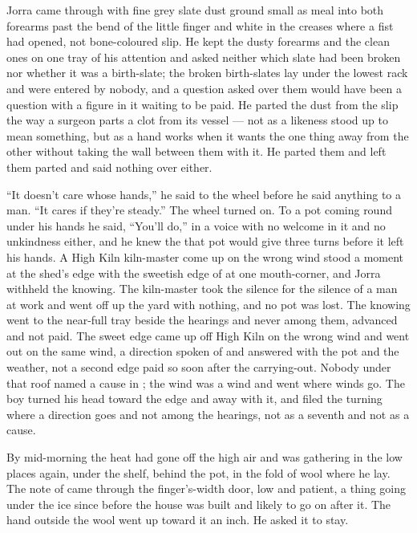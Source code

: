 Jorra came through with fine grey slate dust ground small as meal into both forearms past the bend of the little finger and white in the creases where a fist had opened, not bone-coloured slip. He kept the dusty forearms and the clean ones on one tray of his attention and asked neither which slate had been broken nor whether it was a birth-slate; the broken birth-slates lay under the lowest rack and were entered by nobody, and a question asked over them would have been a question with a figure in it waiting to be paid. He parted the dust from the slip the way a surgeon parts a clot from its vessel --- not as a likeness stood up to mean something, but as a hand works when it wants the one thing away from the other without taking the wall between them with it. He parted them and left them parted and said nothing over either.

“It doesn't care whose hands,” he said to the wheel before he said anything to a man. “It cares if they're steady.” The wheel turned on. To a pot coming round under his hands he said, “You'll do,” in a voice with no welcome in it and no unkindness either, and he knew the  that pot would give three turns before it left his hands. A High Kiln kiln-master come up on the wrong wind stood a moment at the shed's edge with the sweetish edge of  at one mouth-corner, and Jorra withheld the knowing. The kiln-master took the silence for the silence of a man at work and went off up the yard with nothing, and no pot was lost. The knowing went to the near-full tray beside the hearings and never among them, advanced and not paid. The sweet edge came up off High Kiln on the wrong wind and went out on the same wind, a direction spoken of and answered with the pot and the weather, not a second edge paid so soon after the carrying-out. Nobody under that roof named a cause in ; the wind was a wind and went where winds go. The boy turned his head toward the edge and away with it, and filed the turning where a direction goes and not among the hearings, not as a seventh and not as a cause.

\scenebreak

By mid-morning the heat had gone off the high air and was gathering in the low places again, under the shelf, behind the pot, in the fold of wool where he lay. The note of  came through the finger's-width door, low and patient, a thing going under the ice since before the house was built and likely to go on after it. The hand outside the wool went up toward it an inch. He asked it to stay.

